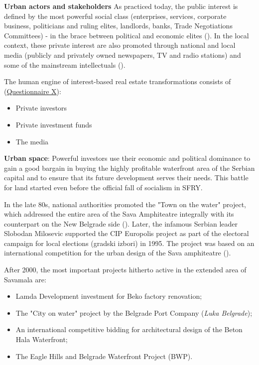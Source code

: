 \documentclass[11pt]{report}
\begin{document}
{{{{\begin{itemize}
\textbf{Urban actors and stakeholders}
As practiced today, the public interest is defined by the most powerful social class (enterprises, services, corporate business, politicians and ruling elites, landlords, banks, Trade Negotiations Committees) - in the brace between political and economic elites (\href{ref}{\citealt{ministarstvo_prostora_urbani_2014}}).
In the local context, these private interest are also promoted through national and local media (publicly and privately owned newspapers, TV and radio stations) and some of the mainstream intellectuals (\href{Nikolic}{\citealt{nikolic_medijska_2015}}).

The human engine of interest-based real estate transformations consists of (\href{Questionnaire Experts Post-socialist}{Questionnaire X}):

\begin{itemize}
\item Private investors
\item Private investment funds
\item The media
\end{itemize}

\textbf{Urban space}:
Powerful investors use their economic and political dominance to gain a good bargain in buying the highly profitable waterfront area of the Serbian capital and to ensure that its future development serves their needs. This battle for land started even before the official fall of socialism in SFRY.

In the late 80s, national authorities promoted the "Town on the water" project, which addressed the entire area of the Sava Amphiteatre integrally with its counterpart on the New Belgrade side (\href{Savski}{\citealt{urbanisticki_zavod_beograda_program_2008}}).
Later, the infamous Serbian leader Slobodan Milosevic supported the CIP Europolis project as part of the electoral campaign for local elections (gradski izbori) in 1995. The project was based on an international competition for the urban design of the Sava amphiteatre (\href{Savski}{\citealt{urbanisticki_zavod_beograda_program_2008}}).

After 2000, the most important projects hitherto active in the extended area of Savamala are:

\begin{itemize}
\item Lamda Development investment for Beko factory renovation;
\item The "City on water" project by the Belgrade Port Company (\textit{Luka Belgrade});
\item An international competitive bidding for architectural design of the Beton Hala Waterfront;
\item The Eagle Hills and Belgrade Waterfront Project (BWP).
\end{itemize}


\end{itemize}}}}}
\end{document}

